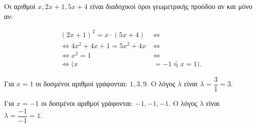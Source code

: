 
\begin{alist}
\item Οι αριθμοί $x, 2x + 1, 5x + 4$ είναι διαδοχικοί όροι γεωμετρικής προόδου αν και
μόνο αν:

\begin{align*}
(2x + 1)^2 = x \cdot (5x + 4) \ &\Leftrightarrow \\
\Leftrightarrow 4x^2 + 4x + 1 = 5x^2 + 4x \ &\Leftrightarrow \\
\Leftrightarrow x^2 = 1 \ &\Leftrightarrow \\
\Leftrightarrow (x &= -1 \text{ ή } x = 1).
\end{align*}

\item
\begin{rlist}
\item Για $x = 1$ οι δοσμένοι αριθμοί γράφονται:
$1, 3, 9$.
Ο λόγος $\lambda$ είναι $\lambda = \dfrac{3}{1} = 3$.

\item Για $x = -1$ οι δοσμένοι αριθμοί γράφονται:
$-1, -1, -1$.
Ο λόγος $\lambda$ είναι $\lambda = \dfrac{-1}{-1} = 1$.
\end{rlist}
\end{alist}

